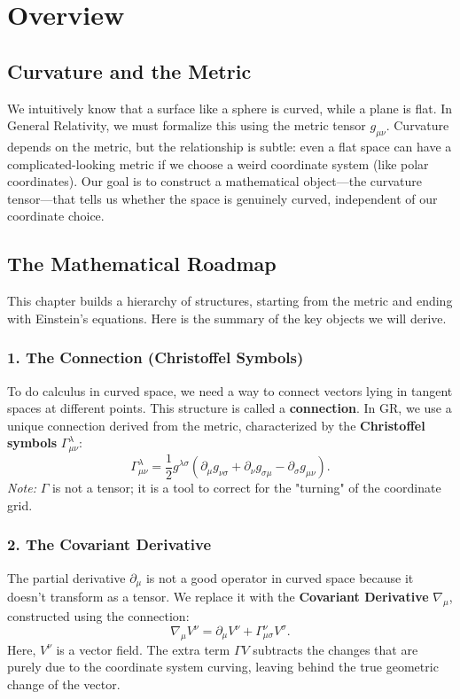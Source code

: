 \documentclass[11pt, a4paper]{report}
\begin{document}
\section{Overview}

\subsection*{Curvature and the Metric}
We intuitively know that a surface like a sphere is curved, while a plane is flat. In General Relativity, we must formalize this using the metric tensor \(g_{\mu\nu}\). Curvature depends on the metric, but the relationship is subtle: even a flat space can have a complicated-looking metric if we choose a weird coordinate system (like polar coordinates). Our goal is to construct a mathematical object—the curvature tensor—that tells us whether the space is genuinely curved, independent of our coordinate choice.

\subsection*{The Mathematical Roadmap}
This chapter builds a hierarchy of structures, starting from the metric and ending with Einstein's equations. Here is the summary of the key objects we will derive.

\subsubsection*{1. The Connection (Christoffel Symbols)}
To do calculus in curved space, we need a way to connect vectors lying in tangent spaces at different points. This structure is called a \textbf{connection}. In GR, we use a unique connection derived from the metric, characterized by the \textbf{Christoffel symbols} \(\Gamma^\lambda_{\mu\nu}\):
\begin{equation}
\label{eq:christoffel_preview}
\Gamma_{\mu\nu}^{\lambda} = \frac{1}{2}g^{\lambda\sigma} (\partial_{\mu}g_{\nu\sigma} + \partial_{\nu}g_{\sigma\mu} - \partial_{\sigma}g_{\mu\nu}).
\end{equation}
\emph{Note:} \(\Gamma\) is not a tensor; it is a tool to correct for the "turning" of the coordinate grid.

\subsubsection*{2. The Covariant Derivative}
The partial derivative \(\partial_\mu\) is not a good operator in curved space because it doesn't transform as a tensor. We replace it with the \textbf{Covariant Derivative} \(\nabla_\mu\), constructed using the connection:
\begin{equation}
\label{eq:cov_deriv_preview}
\nabla_{\mu}V^{\nu} = \partial_{\mu}V^{\nu} + \Gamma_{\mu\sigma}^{\nu}V^{\sigma}.
\end{equation}
Here, \(V^\nu\) is a vector field. The extra term \(\Gamma V\) subtracts the changes that are purely due to the coordinate system curving, leaving behind the true geometric change of the vector.
\end{document}

